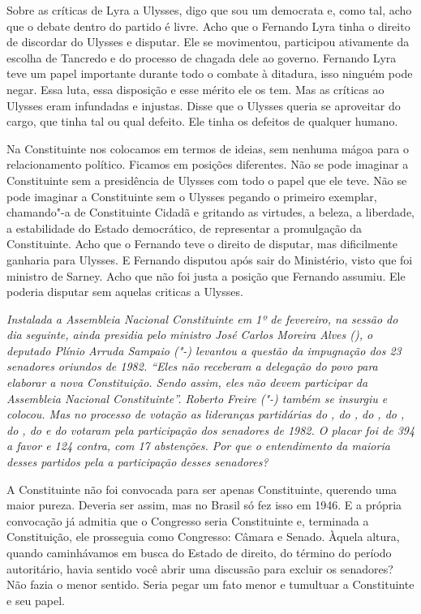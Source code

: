 Sobre as críticas de Lyra a Ulysses, digo que sou um democrata e, como
tal, acho que o debate dentro do partido é livre. Acho que o Fernando
Lyra tinha o direito de discordar do Ulysses e disputar. Ele se
movimentou, participou ativamente da escolha de Tancredo e do processo
de chagada dele ao governo. Fernando Lyra teve um papel importante
durante todo o combate à ditadura, isso ninguém pode negar. Essa luta,
essa disposição e esse mérito ele os tem. Mas as críticas ao Ulysses
eram infundadas e injustas. Disse que o Ulysses queria se aproveitar do
cargo, que tinha tal ou qual defeito. Ele tinha os defeitos de qualquer
humano.

Na Constituinte nos colocamos em termos de ideias, sem nenhuma mágoa
para o relacionamento político. Ficamos em posições diferentes. Não se
pode imaginar a Constituinte sem a presidência de Ulysses com todo o
papel que ele teve. Não se pode imaginar a Constituinte sem o Ulysses
pegando o primeiro exemplar, chamando"-a de Constituinte Cidadã e
gritando as virtudes, a beleza, a liberdade, a estabilidade do Estado
democrático, de representar a promulgação da Constituinte. Acho que o
Fernando teve o direito de disputar, mas dificilmente ganharia para
Ulysses. E Fernando disputou após sair do Ministério, visto que foi
ministro de Sarney. Acho que não foi justa a posição que Fernando
assumiu. Ele poderia disputar sem aquelas criticas a Ulysses.

\medskip

\noindent\emph{Instalada a Assembleia Nacional Constituinte em 1º de fevereiro,
na sessão do dia seguinte, ainda presidia pelo ministro José Carlos
Moreira Alves (), o deputado Plínio Arruda Sampaio ("-) levantou a
questão da impugnação dos 23 senadores oriundos de 1982. ``Eles não
receberam a delegação do povo para elaborar a nova Constituição. Sendo
assim, eles não devem participar da Assembleia Nacional Constituinte''.
Roberto Freire ("-) também se insurgiu e colocou. Mas no processo de
votação as lideranças partidárias do , do , do , do , do
, do  e do  votaram pela participação dos senadores de 1982. O
placar foi de 394 a favor e 124 contra, com 17 abstenções. Por que o
entendimento da maioria desses partidos pela a participação desses
senadores?}

A Constituinte não foi convocada para ser apenas
Constituinte, querendo uma maior pureza. Deveria ser assim, mas no
Brasil só fez isso em 1946. E a própria convocação já admitia que o
Congresso seria Constituinte e, terminada a Constituição, ele prosseguia
como Congresso: Câmara e Senado. Àquela altura, quando caminhávamos em
busca do Estado de direito, do término do período autoritário, havia
sentido você abrir uma discussão para excluir os senadores? Não fazia o
menor sentido. Seria pegar um fato menor e tumultuar a Constituinte e
seu papel.

